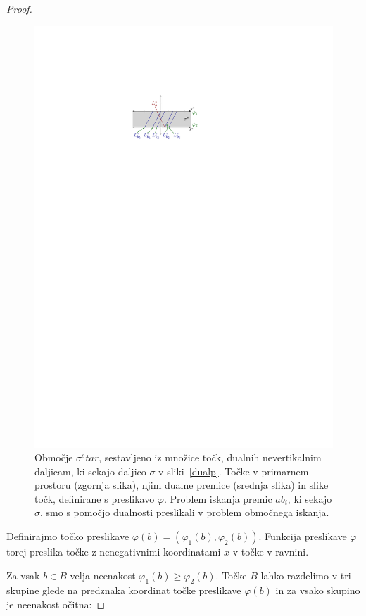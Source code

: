 \documentclass[a4paper, 12pt]{book}
\begin{document}
\begin{proof}
\begin{figure}[htp]
\centerline{\includegraphics[scale=1]{pics/duality-vertical-slab.pdf}}
\caption{Območje $\sigma^star$, sestavljeno iz množice točk, dualnih nevertikalnim daljicam, ki sekajo daljico $\sigma$ v sliki~\ref{dualp}.   Točke v primarnem prostoru (zgornja slika), njim dualne premice (srednja slika) in slike točk, definirane s preslikavo $\varphi$. Problem iskanja premic $ab_i$, ki sekajo $\sigma$, smo s pomočjo dualnosti preslikali v problem območnega iskanja.} 
\label{hslab}
\end{figure}

Definirajmo točko preslikave $\varphi(b)=(\varphi_1(b),\varphi_2(b))$. Funkcija preslikave $\varphi$ torej preslika točke z nenegativnimi koordinatami $x$ v točke v ravnini.

Za vsak $b\in B$ velja neenakost $\varphi_1(b) \geq \varphi_2(b)$. Točke $B$ lahko razdelimo v tri skupine glede na predznaka koordinat točke preslikave $\varphi(b)$ in za vsako skupino je neenakost očitna:


\end{proof}
\end{document}
